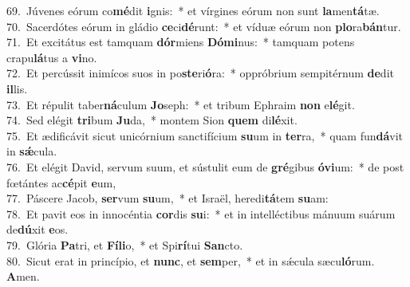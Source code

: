{69.~}Júvenes eórum co\textbf{mé}dit \textbf{i}gnis:~* et vírgines eórum non sunt \textbf{la}men\textbf{tá}tæ.\\
{70.~}Sacerdótes eórum in gládio \textbf{ce}ci\textbf{dé}runt:~* et víduæ eórum non \textbf{plo}ra\textbf{bán}tur.\\
{71.~}Et excitátus est tamquam \textbf{dór}miens \textbf{Dó}\textbf{mi}nus:~* tamquam potens crapu\textbf{lá}tus a \textbf{vi}no.\\
{72.~}Et percússit inimícos suos in po\textbf{ste}ri\textbf{ó}ra:~* oppróbrium sempitérnum \textbf{de}dit \textbf{il}lis.\\
{73.~}Et répulit taber\textbf{ná}culum \textbf{Jo}seph:~* et tribum Ephraim \textbf{non} e\textbf{lé}git.\\
{74.~}Sed elégit \textbf{tri}bum \textbf{Ju}da,~* montem Sion \textbf{quem} di\textbf{lé}xit.\\
{75.~}Et ædificávit sicut unicórnium sanctifícium \textbf{su}um in \textbf{ter}ra,~* quam fun\textbf{dá}vit in \textbf{sǽ}cula.\\
{76.~}Et elégit David, servum suum, et sústulit eum de \textbf{gré}gibus \textbf{ó}\textbf{vi}um:~* de post fœtántes ac\textbf{cé}pit \textbf{e}um,\\
{77.~}Páscere Jacob, \textbf{ser}vum \textbf{su}um,~* et Israël, heredi\textbf{tá}tem \textbf{su}am:\\
{78.~}Et pavit eos in innocéntia \textbf{cor}dis \textbf{su}i:~* et in intelléctibus mánuum suárum de\textbf{dú}xit \textbf{e}os.\\
{79.~}Glória \textbf{Pa}tri, et \textbf{Fí}\textbf{li}o,~* et Spi\textbf{rí}tui \textbf{San}cto.\\
{80.~}Sicut erat in princípio, et \textbf{nunc}, et \textbf{sem}per,~* et in sǽcula sæcu\textbf{ló}rum. \textbf{A}men.\\
